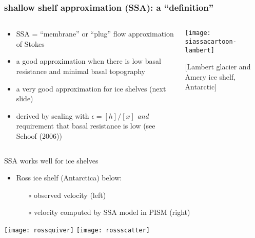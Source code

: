 \documentclass{beamer}
\newcommand{\eps}{\epsilon}
\begin{document}
\begin{frame}
  \frametitle{shallow shelf approximation (SSA): a ``definition''}

\begin{columns}
\begin{column}{0.52\textwidth}
\begin{itemize}
\small
\item SSA = ``membrane'' or ``plug'' flow approximation of Stokes
\item a good approximation when there is low basal resistance and minimal basal topography
\item a very good approximation for ice shelves (next slide)
\item derived by scaling with $\eps = [h]/[x]$ \emph{and} requirement that basal resistance is low (see Schoof (2006))
\end{itemize}
\end{column}

\begin{column}{0.48\textwidth}
\texttt{[image: siassacartoon-lambert]}

\begin{center}
\vspace{-0.18in}
\tiny [Lambert glacier and Amery ice shelf, Antarctic]
\end{center}
\end{column}
\end{columns}
\end{frame}


\begin{frame}{SSA works well for ice shelves}

\begin{itemize}
\item Ross ice shelf (Antarctica) below:
  \begin{itemize}
  \item[$\circ$] observed velocity (left)
  \item[$\circ$] velocity computed by SSA model in PISM  (right)
  \end{itemize}
\end{itemize}

\begin{center}
  \texttt{[image: rossquiver]} \quad  \texttt{[image: rossscatter]}
\end{center}
\end{frame}
\end{document}
